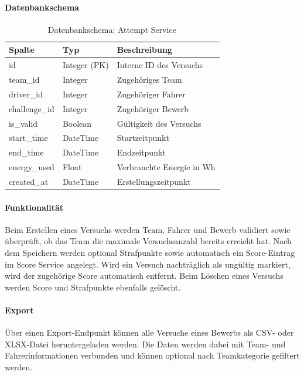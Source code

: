 \paragraph{Datenbankschema}
\begin{table}[h]
    \centering
    \begin{tabular}{|l|l|l|}
        \hline
        \textbf{Spalte} & \textbf{Typ} & \textbf{Beschreibung} \\
        \hline
        id & Integer (PK) & Interne ID des Versuchs \\
        team\_id & Integer & Zugehöriges Team \\
        driver\_id & Integer & Zugehöriger Fahrer \\
        challenge\_id & Integer & Zugehöriger Bewerb \\
        is\_valid & Boolean & Gültigkeit des Versuchs \\
        start\_time & DateTime & Startzeitpunkt \\
        end\_time & DateTime & Endzeitpunkt \\
        energy\_used & Float & Verbrauchte Energie in Wh \\
        created\_at & DateTime & Erstellungszeitpunkt \\
        \hline
    \end{tabular}
    \caption{Datenbankschema: Attempt Service}
    \label{tab:attempt_schema}
\end{table}

\paragraph{Funktionalität}
Beim Erstellen eines Versuchs werden Team, Fahrer und Bewerb 
validiert sowie überprüft, ob das Team die maximale Versuchsanzahl 
bereits erreicht hat. Nach dem Speichern werden optional 
Strafpunkte sowie automatisch ein Score-Eintrag im Score Service 
angelegt. Wird ein Versuch nachträglich als ungültig markiert, 
wird der zugehörige Score automatisch entfernt. Beim Löschen 
eines Versuchs werden Score und Strafpunkte ebenfalls gelöscht.

\paragraph{Export}
Über einen Export-Endpunkt können alle Versuche eines Bewerbs als CSV- oder XLSX-Datei heruntergeladen werden. 
Die Daten werden dabei mit Team- und Fahrerinformationen verbunden und können optional nach Teamkategorie gefiltert werden.

